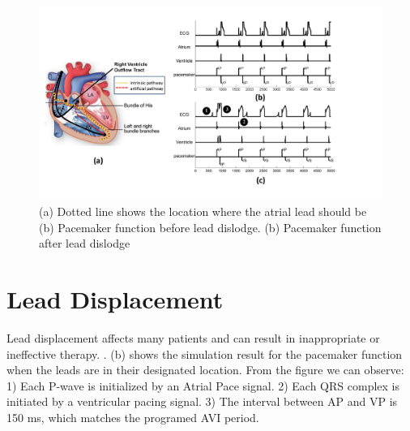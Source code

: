 \begin{figure}[t]
\centering
\vspace{-10pt}
		\includegraphics[width=\textwidth]{figs/dislodge_all.pdf}
\caption{\small (a) Dotted line shows the location where the atrial lead should be (b) Pacemaker function before lead dislodge. (b) Pacemaker function after lead dislodge}
		\label{fig:dislodge_all}

\end{figure} 


\section{Lead Displacement}
Lead displacement affects many patients and can result in inappropriate or ineffective therapy. . (b) shows the simulation result for the pacemaker function when the leads are in their designated location. From the figure we can observe: 1) Each P-wave is initialized by an Atrial Pace signal. 2) Each QRS complex is initiated by a ventricular pacing signal. 3) The interval between AP and VP is 150 ms, which matches the programed AVI period.


